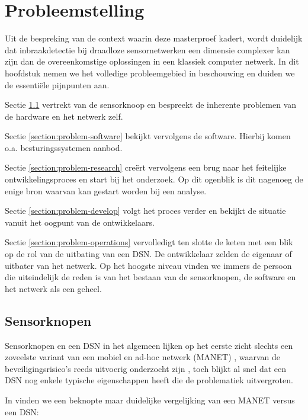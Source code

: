
\chapter{Probleemstelling}
\label{chapter:probleemstelling}

Uit de bespreking van de context waarin deze masterproef kadert, wordt
duidelijk dat inbraakdetectie bij draadloze sensornetwerken een dimensie
complexer kan zijn dan de overeenkomstige oplossingen in een klassiek computer
netwerk. In dit hoofdstuk nemen we het volledige probleemgebied in beschouwing
en duiden we de essenti\"ele pijnpunten aan.

Sectie \ref{section:problem-hardware} vertrekt van de sensorknoop en bespreekt
de inherente problemen van de hardware en het netwerk zelf.

Sectie \ref{section:problem-software} bekijkt vervolgens de software. Hierbij
komen o.a. besturingssystemen aanbod.

Sectie \ref{section:problem-research} cre\"ert vervolgens een brug naar het
feitelijke ontwikkelingsproces en start bij het onderzoek. Op dit ogenblik is
dit nagenoeg de enige bron waarvan kan gestart worden bij een analyse.

Sectie \ref{section:problem-develop} volgt het proces verder en bekijkt de
situatie vanuit het oogpunt van de ontwikkelaars.

Sectie \ref{section:problem-operations} vervolledigt ten slotte de keten met
een blik op de rol van de uitbating van een DSN. De ontwikkelaar zelden de
eigenaar of uitbater van het netwerk. Op het hoogste niveau vinden we immers de
persoon die uiteindelijk de reden is van het bestaan van de sensorknopen, de
software en het netwerk als een geheel.

\section{Sensorknopen}
\label{section:problem-hardware}

Sensorknopen en een DSN in het algemeen lijken op het eerste zicht slechts een
zoveelste variant van een mobiel en ad-hoc netwerk (MANET)
\citep{garg2010mobile}, waarvan de beveiligingsrisico's reeds uitvoerig
onderzocht zijn \citep{djenouri2005survey, zhang2000intrusion,
kachirski2003effective}, toch blijkt al snel dat een DSN nog enkele typische
eigenschappen heeft die de problematiek uitvergroten.

In \citep{garg2010mobile} vinden we een beknopte maar duidelijke vergelijking
van een MANET versus een DSN:


